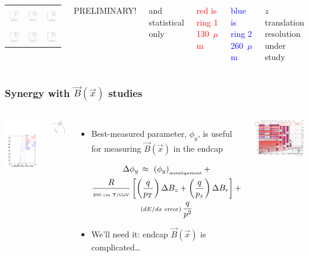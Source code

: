 \documentclass[compress]{beamer}
\begin{document}
\begin{frame}
\begin{columns}
\begin{tabular}{p{0.3\linewidth} p{0.3\linewidth} p{0.3\linewidth}}
\includegraphics[width=\linewidth]{goodmodel_x.pdf} & \includegraphics[width=\linewidth]{goodmodel_phiz.pdf} & \includegraphics[width=\linewidth]{goodmodel_phiy.pdf} \\
\includegraphics[width=\linewidth]{goodmodel_xnorm.pdf} & \includegraphics[width=\linewidth]{goodmodel_phiznorm.pdf} & \includegraphics[width=\linewidth]{goodmodel_phiynorm.pdf}
\end{tabular}

\tiny
PRELIMINARY!

\vspace{0.05 cm}
and statistical only

\vspace{0.25 cm}
\textcolor{red}{red is ring 1}
\textcolor{red}{\small 130~$\mu$m}

\vspace{0.25 cm}
\textcolor{blue}{blue is ring 2}
\textcolor{blue}{\small 260~$\mu$m}

\vspace{0.5 cm}
$z$ translation resolution under study

\vspace{1.5 cm}
\end{columns}
\end{frame}

\begin{frame}
\frametitle{Synergy with $\vec{B}(\vec{x})$ studies}

\begin{columns}
\includegraphics[width=\linewidth]{goodmodel_phiy.pdf}

\hfill \includegraphics[width=0.8\linewidth]{bfield_components.pdf}
\begin{itemize}
\item Best-measured parameter, $\phi_y$, is useful for measuring $\vec{B}(\vec{x})$ in the endcap

\vspace{-0.75 cm}
{\scriptsize
\begin{multline*}
\Delta \phi_y \, \approx \, \, \left(\phi_y\right)_{\mbox{\tiny misalignment}} + \\
\dfrac{R}{\mbox{\tiny 300 cm T/GeV}} \left[\left(\dfrac{q}{p_T}\right) \Delta B_z + \left(\dfrac{q}{p_z}\right) \Delta B_r \right] + \\
\mbox{\scriptsize ($dE/dx$ error)} \, \dfrac{q}{p^2}
\end{multline*}}

\vspace{-0.75 cm}
\item We'll need it: endcap $\vec{B}(\vec{x})$ is complicated\ldots
\end{itemize}

\hfill \includegraphics[width=0.8\linewidth]{muon_system_with_lines.png}

\end{columns}
\end{frame}

\begin{frame}
\frametitl
\end{frame}
\end{document}
